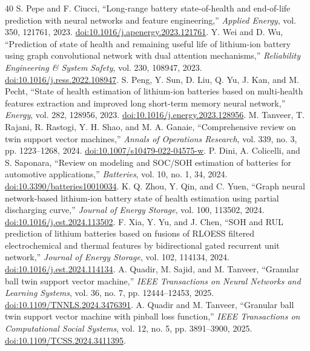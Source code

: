 \begin{thebibliography}{40}
 S. Pepe and F. Ciucci, ``Long-range battery state-of-health and end-of-life prediction with neural networks and feature engineering,'' \emph{Applied Energy}, vol. 350, 121761, 2023. \href{https://doi.org/10.1016/j.apenergy.2023.121761}{doi:10.1016/j.apenergy.2023.121761}.
 Y. Wei and D. Wu, ``Prediction of state of health and remaining useful life of lithium-ion battery using graph convolutional network with dual attention mechanisms,'' \emph{Reliability Engineering \& System Safety}, vol. 230, 108947, 2023. \href{https://doi.org/10.1016/j.ress.2022.108947}{doi:10.1016/j.ress.2022.108947}.
 S. Peng, Y. Sun, D. Liu, Q. Yu, J. Kan, and M. Pecht, ``State of health estimation of lithium-ion batteries based on multi-health features extraction and improved long short-term memory neural network,'' \emph{Energy}, vol. 282, 128956, 2023. \href{https://doi.org/10.1016/j.energy.2023.128956}{doi:10.1016/j.energy.2023.128956}.
 M. Tanveer, T. Rajani, R. Rastogi, Y. H. Shao, and M. A. Ganaie, ``Comprehensive review on twin support vector machines,'' \emph{Annals of Operations Research}, vol. 339, no. 3, pp. 1223--1268, 2024. \href{https://doi.org/10.1007/s10479-022-04575-w}{doi:10.1007/s10479-022-04575-w}.
 P. Dini, A. Colicelli, and S. Saponara, ``Review on modeling and SOC/SOH estimation of batteries for automotive applications,'' \emph{Batteries}, vol. 10, no. 1, 34, 2024. \href{https://doi.org/10.3390/batteries10010034}{doi:10.3390/batteries10010034}.
 K. Q. Zhou, Y. Qin, and C. Yuen, ``Graph neural network-based lithium-ion battery state of health estimation using partial discharging curve,'' \emph{Journal of Energy Storage}, vol. 100, 113502, 2024. \href{https://doi.org/10.1016/j.est.2024.113502}{doi:10.1016/j.est.2024.113502}.
 F. Xia, Y. Yu, and J. Chen, ``SOH and RUL prediction of lithium batteries based on fusions of RLOESS filtered electrochemical and thermal features by bidirectional gated recurrent unit network,'' \emph{Journal of Energy Storage}, vol. 102, 114134, 2024. \href{https://doi.org/10.1016/j.est.2024.114134}{doi:10.1016/j.est.2024.114134}.
 A. Quadir, M. Sajid, and M. Tanveer, ``Granular ball twin support vector machine,'' \emph{IEEE Transactions on Neural Networks and Learning Systems}, vol. 36, no. 7, pp. 12444--12453, 2025. \href{https://doi.org/10.1109/TNNLS.2024.3476391}{doi:10.1109/TNNLS.2024.3476391}.
 A. Quadir and M. Tanveer, ``Granular ball twin support vector machine with pinball loss function,'' \emph{IEEE Transactions on Computational Social Systems}, vol. 12, no. 5, pp. 3891--3900, 2025. \href{https://doi.org/10.1109/TCSS.2024.3411395}{doi:10.1109/TCSS.2024.3411395}.

\end{thebibliography}
